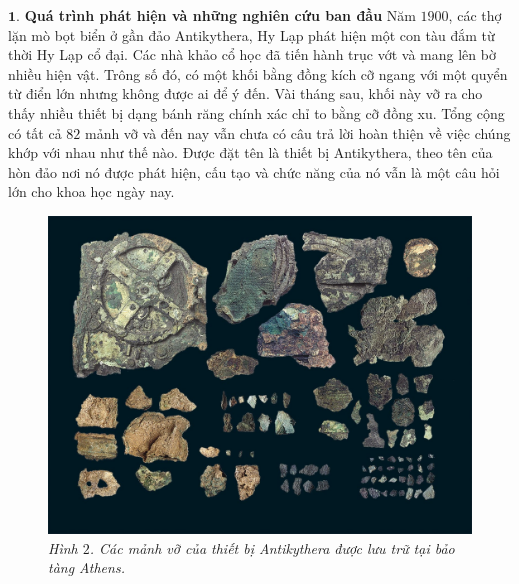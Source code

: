 \begin{multicols}{2}
	\vskip 0.1cm
	$\pmb{1.}$ \textbf{\color{lichsutoanhoc}Quá trình phát hiện và những nghiên cứu ban đầu}
	\vskip 0.1cm
	Năm $1900$, các thợ lặn mò bọt biển ở gần đảo Antikythera, Hy Lạp phát hiện một con tàu đắm từ thời Hy Lạp cổ đại. Các nhà khảo cổ học đã tiến hành trục vớt và mang lên bờ nhiều hiện vật. Trông số đó, có một khối bằng đồng kích cỡ ngang với một quyển từ điển lớn nhưng không được ai để ý đến. Vài tháng sau, khối này vỡ ra cho thấy nhiều thiết bị dạng bánh răng chính xác chỉ to bằng cỡ đồng xu. Tổng cộng có tất cả $82$ mảnh vỡ và đến nay vẫn chưa có câu trả lời hoàn thiện về việc chúng khớp với nhau như thế nào. Được đặt tên là thiết bị Antikythera, theo tên của hòn đảo nơi nó được phát hiện, cấu tạo và chức năng của nó vẫn là một câu hỏi lớn cho khoa học ngày nay.
	\begin{figure}[H]
		\vspace*{5pt}
		\centering
		\captionsetup{labelformat= empty, justification=centering}
		\includegraphics[width= 1\linewidth]{2}
		\caption{\small\textit{\color{lichsutoanhoc}Hình $2$. Các mảnh vỡ của thiết bị Antikythera được lưu trữ tại bảo tàng Athens.}}
		\vspace*{-10pt}
	\end{figure}

\end{multicols}
